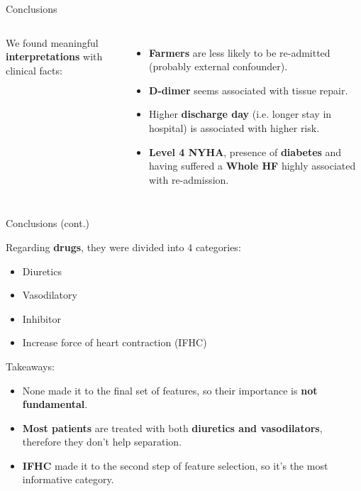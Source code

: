 \documentclass[aspectratio=169,xcolor=dvipsnames,handout]{beamer}
\begin{document}
\begin{frame}{Conclusions}
\begin{columns}[c]
        We found meaningful \textbf{interpretations} with clinical facts:
        \begin{itemize}
            \item \textbf{Farmers} are less likely to be re-admitted (probably external confounder).
            \item \textbf{D-dimer} seems associated with tissue repair.
            \item Higher \textbf{discharge day} (i.e. longer stay in hospital) is associated with higher risk.
            \item \textbf{Level 4 NYHA}, presence of \textbf{diabetes} and having suffered a \textbf{Whole HF} highly associated with re-admission.
        \end{itemize}
    \end{columns}
    
\end{frame}

\begin{frame}{Conclusions (cont.)}

    Regarding \textbf{drugs}, they were divided into 4 categories:
    \begin{itemize}
        \item Diuretics
        \item Vasodilatory
        \item Inhibitor
        \item Increase force of heart contraction (IFHC)
    \end{itemize}
    \pause
    Takeaways:
    \begin{itemize}
        \item None made it to the final set of features, so their importance is \textbf{not fundamental}.
        \pause
        \item \textbf{Most patients} are treated with both \textbf{diuretics and vasodilators}, therefore they don't help separation.
        \pause
        \item \textbf{IFHC} made it to the second step of feature selection, so it's the most informative category.
    \end{itemize}

\end{frame}
\end{document}

